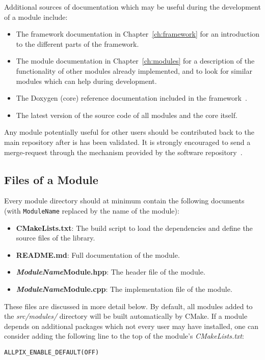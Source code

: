 Additional sources of documentation which may be useful during the development of a module include:
\begin{itemize}
\item The framework documentation in Chapter~\ref{ch:framework} for an introduction to the different parts of the framework.
\item The module documentation in Chapter~\ref{ch:modules} for a description of the functionality of other modules already implemented, and to look for similar modules which can help during development.
\item The Doxygen (core) reference documentation included in the framework~\cite{ap2-doxygen}.
\item The latest version of the source code of all modules and the \apsq core itself.
\end{itemize}

Any module potentially useful for other users should be contributed back to the main repository after is has been validated.
It is strongly encouraged to send a merge-request through the mechanism provided by the software repository~\cite{ap2-repo}.

\subsection{Files of a Module}
\label{sec:module_files}
Every module directory should at minimum contain the following documents (with \texttt{ModuleName} replaced by the name of the module):
\begin{itemize}
\item \textbf{CMakeLists.txt}: The build script to load the dependencies and define the source files of the library.
\item \textbf{README.md}: Full documentation of the module.
\item \textbf{\textit{ModuleName}Module.hpp}: The header file of the module.
\item \textbf{\textit{ModuleName}Module.cpp}: The implementation file of the module.
\end{itemize}
These files are discussed in more detail below.
By default, all modules added to the \textit{src/modules/} directory will be built automatically by CMake.
If a module depends on additional packages which not every user may have installed, one can consider adding the following line to the top of the module's \textit{CMakeLists.txt}:
\begin{verbatim}
ALLPIX_ENABLE_DEFAULT(OFF)
\end{verbatim}

